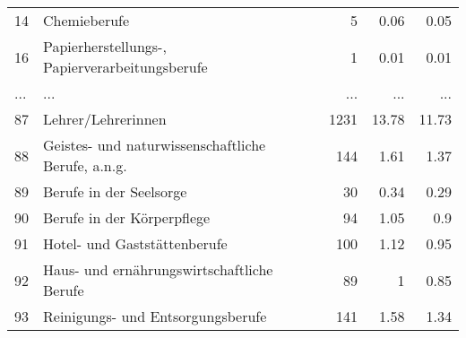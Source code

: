 \begin{longtable}{lXrrr}
        14 & \multicolumn{1}{X}{Chemieberufe} & %
          \num{5} &
          \num[round-mode=places,round-precision=2]{0.06} &
          \num[round-mode=places,round-precision=2]{0.05} \\
        16 & \multicolumn{1}{X}{Papierherstellungs-, Papierverarbeitungsberufe} & %
          \num{1} &
          \num[round-mode=places,round-precision=2]{0.01} &
          \num[round-mode=places,round-precision=2]{0.01} \\
       ... & ... & ... & ... & ... \\
        87 & \multicolumn{1}{X}{Lehrer/Lehrerinnen} & %
          \num{1231} &
          \num[round-mode=places,round-precision=2]{13.78} &
          \num[round-mode=places,round-precision=2]{11.73} \\

        88 & \multicolumn{1}{X}{Geistes- und naturwissenschaftliche Berufe, a.n.g.} & %
          \num{144} &
          \num[round-mode=places,round-precision=2]{1.61} &
          \num[round-mode=places,round-precision=2]{1.37} \\

        89 & \multicolumn{1}{X}{Berufe in der Seelsorge} & %
          \num{30} &
          \num[round-mode=places,round-precision=2]{0.34} &
          \num[round-mode=places,round-precision=2]{0.29} \\

        90 & \multicolumn{1}{X}{Berufe in der Körperpflege} & %
          \num{94} &
          \num[round-mode=places,round-precision=2]{1.05} &
          \num[round-mode=places,round-precision=2]{0.9} \\

        91 & \multicolumn{1}{X}{Hotel- und Gaststättenberufe} & %
          \num{100} &
          \num[round-mode=places,round-precision=2]{1.12} &
          \num[round-mode=places,round-precision=2]{0.95} \\

        92 & \multicolumn{1}{X}{Haus- und ernährungswirtschaftliche Berufe} & %
          \num{89} &
          \num[round-mode=places,round-precision=2]{1} &
          \num[round-mode=places,round-precision=2]{0.85} \\

        93 & \multicolumn{1}{X}{Reinigungs- und Entsorgungsberufe} & %
          \num{141} &
          \num[round-mode=places,round-precision=2]{1.58} &
          \num[round-mode=places,round-precision=2]{1.34} \\


\end{longtable}

